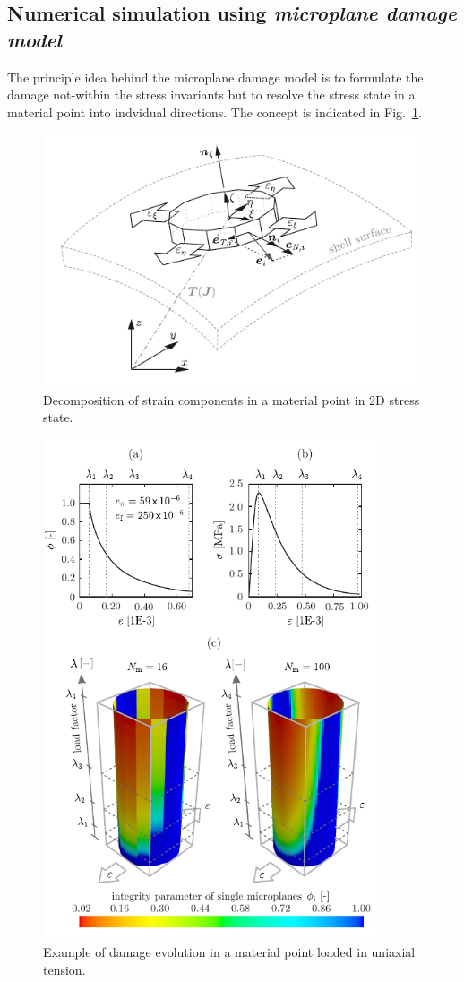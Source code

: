 \documentclass[main.tex]{subfiles}
\begin{document}
\subsection{Numerical simulation using 
\textit{microplane damage model}}

The principle idea behind the microplane damage model is to formulate the damage not-within the stress invariants but to resolve the stress state in a material point into indvidual directions. The concept is indicated in Fig.~\ref{FIGMicroplane-disc}.
\begin{figure}
\centering
\includegraphics[scale=1]{fig/TRC_disc.pdf}
\caption{Decomposition of strain components in a material point in 2D stress state.}
\label{FIGMicroplane-disc}
\end{figure}
\begin{figure}
\centering
\includegraphics[width=10cm]{fig/Damage_plot_cylinder.pdf}
\caption{Example of damage evolution in a material point loaded in uniaxial tension.}
\label{FIGMDM_damage_cylinder}
\end{figure}
\end{document}
